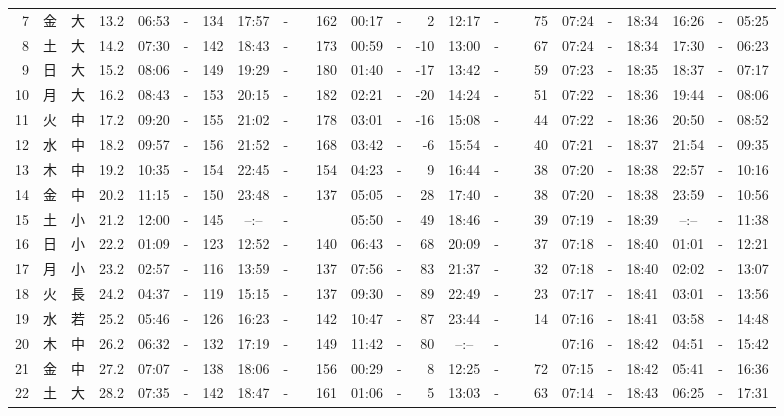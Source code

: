 \documentclass[12pt,a4j]{jsarticle}
\begin{document}
\begin{table}[htbp]
\begin{center}
{\begin{tabular}{|rc|cr|ccrccr|ccrccr|ccc|ccc|}
 7 & 金 & 大 & 13.2 &  06:53 &-& 134 &  17:57 &-& 162 &  00:17 &-&   2 &  12:17 &-&  75 & 07:24 & -& 18:34 & 16:26 & -& 05:25 \\
 8 & 土 & 大 & 14.2 &  07:30 &-& 142 &  18:43 &-& 173 &  00:59 &-& -10 &  13:00 &-&  67 & 07:24 & -& 18:34 & 17:30 & -& 06:23 \\
 9 & 日 & 大 & 15.2 &  08:06 &-& 149 &  19:29 &-& 180 &  01:40 &-& -17 &  13:42 &-&  59 & 07:23 & -& 18:35 & 18:37 & -& 07:17 \\
10 & 月 & 大 & 16.2 &  08:43 &-& 153 &  20:15 &-& 182 &  02:21 &-& -20 &  14:24 &-&  51 & 07:22 & -& 18:36 & 19:44 & -& 08:06 \\
11 & 火 & 中 & 17.2 &  09:20 &-& 155 &  21:02 &-& 178 &  03:01 &-& -16 &  15:08 &-&  44 & 07:22 & -& 18:36 & 20:50 & -& 08:52 \\
12 & 水 & 中 & 18.2 &  09:57 &-& 156 &  21:52 &-& 168 &  03:42 &-&  -6 &  15:54 &-&  40 & 07:21 & -& 18:37 & 21:54 & -& 09:35 \\
13 & 木 & 中 & 19.2 &  10:35 &-& 154 &  22:45 &-& 154 &  04:23 &-&   9 &  16:44 &-&  38 & 07:20 & -& 18:38 & 22:57 & -& 10:16 \\
14 & 金 & 中 & 20.2 &  11:15 &-& 150 &  23:48 &-& 137 &  05:05 &-&  28 &  17:40 &-&  38 & 07:20 & -& 18:38 & 23:59 & -& 10:56 \\
15 & 土 & 小 & 21.2 &  12:00 &-& 145 &  --:-- &-&~~~~~ &  05:50 &-&  49 &  18:46 &-&  39 & 07:19 & -& 18:39 & --:-- & -& 11:38 \\
16 & 日 & 小 & 22.2 &  01:09 &-& 123 &  12:52 &-& 140 &  06:43 &-&  68 &  20:09 &-&  37 & 07:18 & -& 18:40 & 01:01 & -& 12:21 \\
17 & 月 & 小 & 23.2 &  02:57 &-& 116 &  13:59 &-& 137 &  07:56 &-&  83 &  21:37 &-&  32 & 07:18 & -& 18:40 & 02:02 & -& 13:07 \\
18 & 火 & 長 & 24.2 &  04:37 &-& 119 &  15:15 &-& 137 &  09:30 &-&  89 &  22:49 &-&  23 & 07:17 & -& 18:41 & 03:01 & -& 13:56 \\
19 & 水 & 若 & 25.2 &  05:46 &-& 126 &  16:23 &-& 142 &  10:47 &-&  87 &  23:44 &-&  14 & 07:16 & -& 18:41 & 03:58 & -& 14:48 \\
20 & 木 & 中 & 26.2 &  06:32 &-& 132 &  17:19 &-& 149 &  11:42 &-&  80 &  --:-- &-&~~~~~ & 07:16 & -& 18:42 & 04:51 & -& 15:42 \\
21 & 金 & 中 & 27.2 &  07:07 &-& 138 &  18:06 &-& 156 &  00:29 &-&   8 &  12:25 &-&  72 & 07:15 & -& 18:42 & 05:41 & -& 16:36 \\
22 & 土 & 大 & 28.2 &  07:35 &-& 142 &  18:47 &-& 161 &  01:06 &-&   5 &  13:03 &-&  63 & 07:14 & -& 18:43 & 06:25 & -& 17:31 \\

\end{tabular}}
\end{center}
\end{table}
\end{document}
